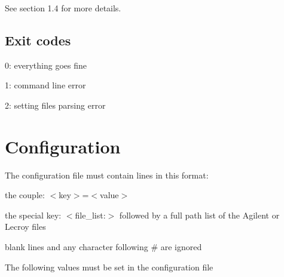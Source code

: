 See section 1.4 for more details. \hypertarget{index_s041}{}\subsection{Exit codes}\label{index_s041}
\begin{DoxyItemize}
\item 0: everything goes fine \item 1: command line error \item 2: setting files parsing error\end{DoxyItemize}
\hypertarget{index_s05}{}\section{Configuration}\label{index_s05}
The configuration file must contain lines in this format:\par
 \begin{DoxyItemize}
\item the couple: $<$key$>$=$<$value$>$ \item the special key: $<$file\_\-list:$>$ followed by a full path list of the Agilent or Lecroy files \item blank lines and any character following \# are ignored\end{DoxyItemize}
The following values must be set in the configuration file

